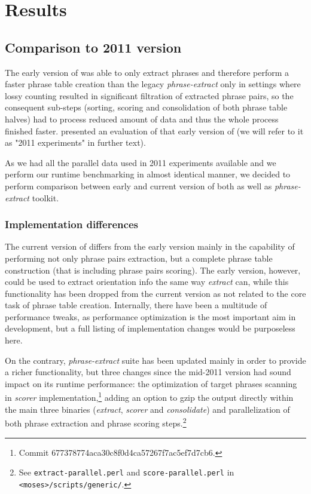 \chapter{Results}
\label{chap:results}

\section{Comparison to 2011 version}

The early version of \eppex{} was able to only extract phrases and therefore
perform a faster phrase table creation than the legacy \emph{phrase-extract}
only in settings where lossy counting resulted in significant filtration of
extracted phrase pairs, so the consequent sub-steps (sorting, scoring and
consolidation of both phrase table halves) had to process reduced amount of
data and thus the whole process finished faster.
\citet{przywara:eppex} presented an evaluation of that early version of
\eppex{} (we will refer to it as "2011 experiments" in further text).

As we had all the parallel data used in 2011 experiments available and
we perform our runtime benchmarking in almost identical manner,
we decided to perform comparison between early and current version of both
\eppex{} as well as \emph{phrase-extract} toolkit.

\subsection{Implementation differences}

The current version of \eppex{} differs from the early version mainly in the
capability of performing not only phrase pairs extraction, but a complete
phrase table construction (that is including phrase pairs scoring).
The early version, however, could be used to extract orientation info
the same way \emph{extract} can, while this functionality has been dropped
from the current version as not related to the core task of phrase table creation.
Internally, there have been a multitude of performance tweaks,
as performance optimization is the most important aim in \eppex{} development,
but a full listing of implementation changes would be purposeless here.

On the contrary, \emph{phrase-extract} suite has been updated mainly in order to
provide a richer functionality, but three changes since the mid-2011 version
had sound impact on its runtime performance: the optimization of target phrases
scanning in \emph{scorer} implementation,\footnote{Commit 677378774aca30c8f0d4ca57267f7ac5ef7d7cb6.}
adding an option to gzip the output directly within the main three binaries
(\emph{extract}, \emph{scorer} and \emph{consolidate})
and parallelization of both phrase extraction and phrase scoring
steps.\footnote{See \texttt{extract-parallel.perl} and \texttt{score-parallel.perl}
in \texttt{<moses>/scripts/generic/}.}

